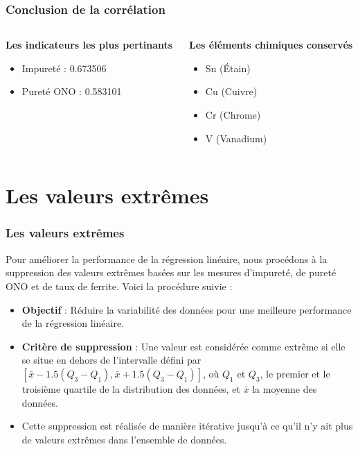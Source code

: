 \documentclass[aspectratio=169]{beamer}
\begin{document}
\begin{frame}
\frametitle{ Conclusion de la corrélation}

\begin{columns} [t] %
  \begin{column}{0.5\textwidth}
      \textbf{Les indicateurs les plus pertinants}
      \begin{itemize}
        \item Impureté : 0.673506
        \item Pureté ONO : 0.583101
      \end{itemize}

 \end{column}
    
  \begin{column}{0.5\textwidth}
      \textbf{Les éléments chimiques conservés}
      \begin{itemize}
        \item Sn (Étain) 
        \item Cu (Cuivre)
        \item Cr (Chrome) 
        \item V (Vanadium)
      \end{itemize}

  \end{column}

\end{columns}
\end{frame}





\section{Les valeurs extrêmes}

\begin{frame}
\frametitle{Les valeurs extrêmes}


\small
Pour améliorer la performance de la régression linéaire, nous procédons à la suppression des valeurs extrêmes basées sur les mesures d'impureté, de pureté ONO et de taux de ferrite. Voici la procédure suivie :

\begin{itemize}
    \item \textbf{Objectif} : Réduire la variabilité des données pour une meilleure performance de la régression linéaire.
    \item \textbf{Critère de suppression } : Une valeur est considérée comme extrême si elle se situe en dehors de l'intervalle défini par $[\bar{x} - 1.5(Q_3 - Q_1), \bar{x} + 1.5(Q_3 - Q_1)]$, où $Q_1$ et $Q_3$, le premier et le troisième quartile de la distribution des données, et $\bar{x}$ la moyenne des données.
    \item Cette suppression est réalisée de manière itérative jusqu'à ce qu'il n'y ait plus de valeurs extrêmes dans l'ensemble de données.
\end{itemize}

\end{frame}
\end{document}
